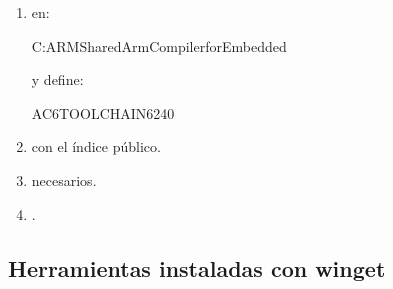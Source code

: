\documentclass[letterpaper,10pt,english]{sphinxmanual}
\begin{document}
\begin{enumerate}
\item {} 
\sphinxAtStartPar
{} en:

\begin{sphinxVerbatim}[commandchars=\\\{\}]
C:\PYGZbs{}ARM\PYGZhy{}Shared\PYGZbs{}ArmCompilerforEmbedded
\end{sphinxVerbatim}

\sphinxAtStartPar
y define:

\begin{sphinxVerbatim}[commandchars=\\\{\}]
AC6\PYGZus{}TOOLCHAIN\PYGZus{}6\PYGZus{}24\PYGZus{}0
\end{sphinxVerbatim}

\item {} 
\sphinxAtStartPar
{} con el índice público.

\item {} 
\sphinxAtStartPar
{} necesarios.

\item {} 
\sphinxAtStartPar
{}.

\end{enumerate}


\subsection{Herramientas instaladas con winget}
\label{\detokenize{vscode:herramientas-instaladas-con-winget}}
\end{document}
